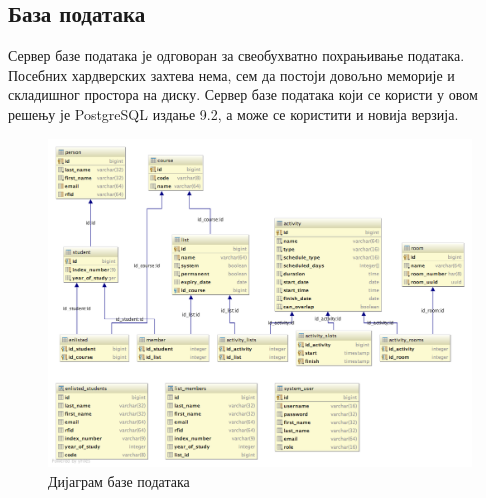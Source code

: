 \documentclass[a4paper, 12pt, diplomski]{etfcyr}
\begin{document}
             \subsection{База података}
                 \begin{justify}
                     Сервер базе података је одговоран за свеобухватно похрањивање података. Посебних хардверских захтева нема, сем да постоји довољно меморије и складишног простора на диску. Сервер базе података који се користи у овом решењу је PostgreSQL издање 9.2, а може се користити и новија верзија.
                     \begin{figure}[h]
                         \begin{center}
                             \includegraphics[scale=0.35]{DatabaseDiagram.png}
                         \end{center}
                         \caption{Дијаграм базе података}
                     \end{figure}
                 \end{justify}
                 
\end{document}
